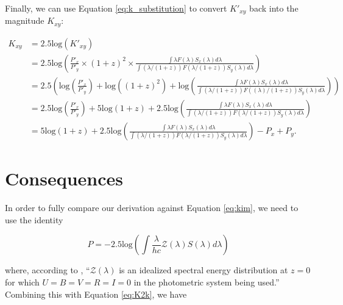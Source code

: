 \documentclass[linenumbers]{aastex631}
\begin{document}
Finally, we can use Equation \ref{eq:k_substitution} to convert $K'_{xy}$ back
into the magnitude $K_{xy}$:

\begin{equation}
\begin{aligned}
\label{eq:K2k}
  K_{xy} &= 2.5\text{log}(K'_{xy}) \\
         &= 2.5\text{log}\left(
            \frac{P'_x}{P'_y} \times (1 + z)^2 \times
            \frac{\int \lambda F(\lambda) S_x(\lambda) d\lambda}
                 {\int (\lambda / (1+z)) F(\lambda / (1+z)) S_y(\lambda) d\lambda}\right) \\
         &= 2.5 \left(
            \text{log} \left( \frac{P'_x}{P'_y} \right)
            + \text{log}( {(1 + z)^2})
            + \text{log}\left( \frac{\int \lambda F(\lambda) S_x(\lambda) d\lambda}
                                    {\int (\lambda / (1+z)) F((\lambda)/ (1+z)) S_y(\lambda) d\lambda}
            \right) \right) \\
         &= 2.5 \text{log} \left( \frac{P'_x}{P'_y} \right)
            + 5 \text{log} (1 + z)
            + 2.5 \text{log} \left(
              \frac{\int \lambda F(\lambda) S_x(\lambda) d\lambda}
                   {\int (\lambda / (1+z)) F(\lambda / (1+z)) S_y(\lambda) d\lambda} \right) \\
         &= 5 \text{log} (1 + z)
            + 2.5 \text{log} \left(
              \frac{\int \lambda F(\lambda) S_x(\lambda) d\lambda}
                   {\int (\lambda / (1+z)) F(\lambda / (1+z)) S_y(\lambda) d\lambda} \right)
            - P_x + P_y .
\end{aligned}
\end{equation}

\section{Consequences}
\label{sec:consequences}

In order to fully compare our derivation against Equation \ref{eq:kim}, we need
to use the identity

\begin{equation}
  P = -2.5 \text{log} \left( \int \frac{\lambda}{hc} \mathcal{Z}(\lambda) S(\lambda) d\lambda \right)
\end{equation}

\noindent where, according to \citet{kim1996}, ``$\mathcal{Z}(\lambda)$ is an
idealized spectral energy distribution at $z = 0$ for which
$U = B = V = R = I = 0$ in the photometric system being used.'' Combining this
with Equation \ref{eq:K2k}, we have
\end{document}
